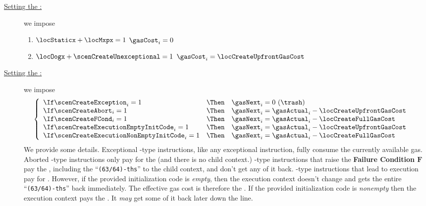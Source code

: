 \begin{description}
	\item[\underline{Setting the \gasCost{}:}]
		we impose
		\begin{enumerate}
			\item \If $\locStaticx + \locMxpx = 1$              \Then $\gasCost _{i} = 0$
			\item \If $\locOogx + \scenCreateUnexceptional = 1$ \Then $\gasCost _{i} = \locCreateUpfrontGasCost$
		\end{enumerate}
	\item[\underline{Setting the \gasNext{}:}]
		we impose
		\[
			\hspace*{-0.5cm}
			\left\{ \begin{array}{lcl}
				\If \scenCreateException                 _{i} = 1 & \Then & \gasNext _{i} = 0 ~ (\trash)                               \\
				\If \scenCreateAbort                     _{i} = 1 & \Then & \gasNext _{i} = \gasActual _{i} - \locCreateUpfrontGasCost \\
				\If \scenCreateFCond                     _{i} = 1 & \Then & \gasNext _{i} = \gasActual _{i} - \locCreateFullGasCost    \\
				\If \scenCreateExecutionEmptyInitCode    _{i} = 1 & \Then & \gasNext _{i} = \gasActual _{i} - \locCreateUpfrontGasCost \\
				\If \scenCreateExecutionNonEmptyInitCode _{i} = 1 & \Then & \gasNext _{i} = \gasActual _{i} - \locCreateFullGasCost    \\
			\end{array} \right.
		\]
		\saNote{}
		We provide some details.
		Exceptional -type instructions, like any exceptional instruction, fully consume the currently available gas.
		Aborted -type instructions only pay for the \locCreateUpfrontGasCost{} (and there is no child context.)
		-type instructions that raise the \textbf{Failure Condition $\bm{F}$} pay the \locCreateFullGasCost{}, including the ``\texttt{(63/64)-ths}'' to the child context, and don't get any of it back.
		-type instructions that lead to execution pay for \locCreateFullGasCost{}.
		However, if the provided initialization code is \emph{empty}, then the execution context doesn't change and gets the entire ``\texttt{(63/64)-ths}'' back immediately.
		The effective gas cost is therefore the \locCreateUpfrontGasCost{}.
		If the provided initialization code is \emph{nonempty} then the execution context pays the \locCreateFullGasCost{}.
		It \emph{may} get some of it back later down the line.
\end{description}
